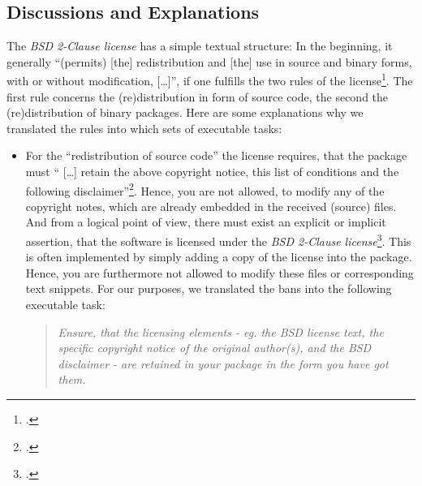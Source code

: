 \subsection{Discussions and Explanations}

The \textit{BSD 2-Clause license} has a simple textual structure: In the
beginning, it generally \enquote{(permits) [the] redistribution and [the] use in
source and binary forms, with or without modification, [\ldots]}, if one
fulfills the two rules of the license\footcite[cf.][\nopage
wp]{BsdLicense2Clause}. The first rule concerns the (re)distribution in form of
source code, the second the (re)distribution of binary packages. Here are some
explanations why we translated the rules into which sets of executable tasks:

\begin{itemize}
\item For the \enquote{redistribution of source code} the license requires,
that the package must \enquote{ [\ldots] retain the above copyright notice, this
list of conditions and the following disclaimer}\footcite[cf.][\nopage
wp]{BsdLicense2Clause}. Hence, you are not allowed, to modify any of the
copyright notes, which are already embedded in the received (source) files. And
from a logical point of view, there must exist an explicit or implicit
assertion, that the software is licensed under the \textit{BSD 2-Clause
license}\footcite[The BSD license requires, that a re-distributed software
package must contain the (package specific) copyright notice, the (license
specific) conditions and the BSD disclaimer. (cf.][\nopage wp.) You might ask
what you should do, if these elements are missed in the package you got. If so,
the package you got had not been licensed adequately. Hence, you do not know
reliably whether you have received it under a BSD license. In other words: If
you have received a BSD licensed software package, it must contain sufficient
license fulfilling elements, or it is not a BSD licensed
software]{BsdLicense2Clause}. This is often implemented by simply adding a copy
of the license into the package. Hence, you are furthermore not allowed to
modify these files or corresponding text snippets. For our purposes, we
translated the bans into the following executable task:

\begin{quote}\textit{Ensure, that the licensing elements - eg. the BSD license
text, the specific copyright notice of the original author(s), and the BSD disclaimer
- are retained in your package in the form you have got them.}\end{quote}


\end{itemize}
